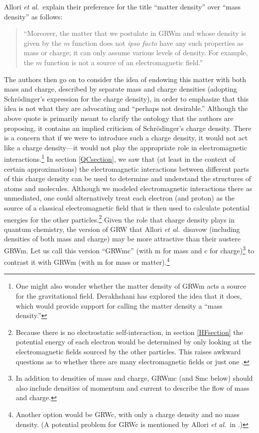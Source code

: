 \documentclass[12pt,onecolumn,secnumarabic,amsmath,amssymb,balancelastpage,nofootinbib]{article}
\begin{document}
Allori \emph{et al.}\ explain their preference for the title ``matter density'' over ``mass density'' as follows:
\begin{quote}
``Moreover, the matter that we postulate in GRWm and whose density is given by the $m$ function does not \emph{ipso facto} have any such properties as mass or charge; it can only assume various levels of density. For example, the $m$ function is not a source of an electromagnetic field.'' \cite[pg.\ 331--332]{allori2014}
\end{quote}
The authors then go on to consider the idea of endowing this matter with both mass and charge, described by separate mass and charge densities (adopting Schr\"{o}dinger's expression for the charge density), in order to emphasize that this idea is not what they are advocating and ``perhaps not desirable.''  Although the above quote is primarily meant to clarify the ontology that the authors are proposing, it contains an implied criticism of Schr\"{o}dinger's charge density.  There is a concern that if we were to introduce such a charge density, it would not act like a charge density---it would not play the appropriate role in electromagnetic interactions.\footnote{One might also wonder whether the matter density of GRWm acts a source for the gravitational field.  Derakhshani \cite{derakhshani2014} has explored the idea that it does, which would provide support for calling the matter density a ``mass density.''}  In section \ref{QCsection}, we saw that (at least in the context of certain approximations) the electromagnetic interactions between different parts of this charge density can be used to determine and understand the structures of atoms and molecules.  Although we modeled electromagnetic interactions there as unmediated, one could alternatively treat each electron (and proton) as the source of a classical electromagnetic field that is then used to calculate potential energies for the other particles.\footnote{Because there is no electrostatic self-interaction, in section \ref{HFsection} the potential energy of each electron would be determined by only looking at the electromagnetic fields sourced by the other particles.  This raises awkward questions as to whether there are many electromagnetic fields or just one \cite[pg.\ 36, 158]{lange}.}  Given the role that charge density plays in quantum chemistry, the version of GRW that Allori \emph{et al.}\ disavow (including densities of both mass and charge) may be more attractive than their austere GRWm.  Let us call this version ``GRWmc'' (with m for mass and c for charge)\footnote{In addition to densities of mass and charge, GRWmc (and Smc below) should also include densities of momentum and current to describe the flow of mass and charge.} to contrast it with GRWm (with m for mass or matter).\footnote{Another option would be GRWc, with only a charge density and no mass density.  (A potential problem for GRWc is mentioned by Allori \emph{et al.}\ in \cite[footnote 1]{allori2011}.)}
\end{document}
